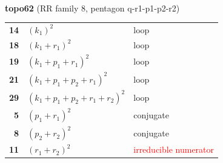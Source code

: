 \documentclass[10pt]{article}
\begin{document}
\begin{minipage}[t]{0.48\textwidth}
{}\\[2mm]\textbf{topo62} (RR family 8, pentagon q-r1-p1-p2-r2)\\[2pt]{\footnotesize\begin{tabular}{@{}r@{\ \ }l@{\ \ }l@{}}\textbf{14} & $(k_1)^2$ & loop\\
\textbf{18} & $(k_1+r_1)^2$ & loop\\
\textbf{19} & $(k_1+p_1+r_1)^2$ & loop\\
\textbf{21} & $(k_1+p_1+p_2+r_1)^2$ & loop\\
\textbf{29} & $(k_1+p_1+p_2+r_1+r_2)^2$ & loop\\
\textbf{5} & $(p_1+r_1)^2$ & conjugate\\
\textbf{8} & $(p_2+r_2)^2$ & conjugate\\
\textbf{11} & $(r_1+r_2)^2$ & \textcolor{red}{irreducible numerator}\\\end{tabular}}\end{minipage}

\bigskip
\end{document}
